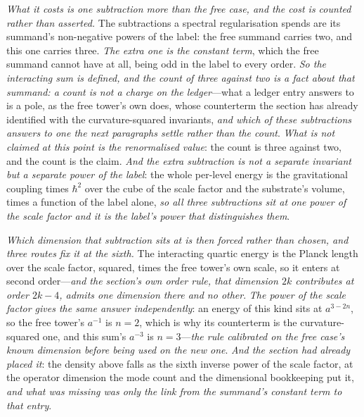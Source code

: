 \documentclass[11pt,a4paper]{article}
\theoremstyle{plain}
\theoremstyle{definition}
\theoremstyle{remark}
\begin{document}
\emph{What it costs is one subtraction more than the free case, and the cost is counted rather than asserted.}
The subtractions a spectral regularisation spends are its summand's non-negative powers of the label: the free
summand carries two, and this one carries three. \emph{The extra one is the constant term}, which the free
summand cannot have at all, being odd in the label to every order. \emph{So the interacting sum is defined, and the
count of three against two is a fact about that summand: a count is not a charge on the ledger}---what a ledger
entry answers to is a pole, as the free tower's own does, whose counterterm the section has already identified with
the curvature-squared invariants, \emph{and which of these subtractions answers to one the next paragraphs settle
rather than the count}. \emph{What is not claimed at this point is the renormalised value}: the count is three
against two, and the count is the claim. \emph{And the extra subtraction is not a separate invariant but a separate power of the label}: the
whole per-level energy is the gravitational coupling times $\hbar^{2}$ over the cube of the scale factor and the
substrate's volume, times a function of the label alone, \emph{so all three subtractions sit at one power of the scale factor and it is the
label's power that distinguishes them}.

\emph{Which dimension that subtraction sits at is then forced rather than chosen, and three routes fix it at the
sixth.} The interacting quartic energy is the Planck length over the scale factor, squared, times the free tower's
own scale, so it enters at second order---\emph{and the section's own order rule, that dimension $2k$ contributes
at order $2k-4$, admits one dimension there and no other}. \emph{The power of the scale factor gives the same
answer independently}: an energy of this kind sits at $a^{3-2n}$, so the free tower's $a^{-1}$ is $n=2$, which is
why its counterterm is the curvature-squared one, and this sum's $a^{-3}$ is $n=3$---\emph{the rule calibrated on
the free case's known dimension before being used on the new one}. \emph{And the section had already placed it}:
the density above falls as the sixth inverse power of the scale factor, at the operator dimension the mode count
and the dimensional bookkeeping put it, \emph{and what was missing was only the link from the summand's constant
term to that entry}.
\end{document}
